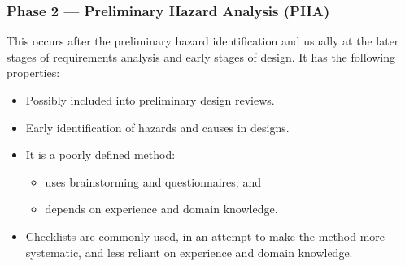 \subsubsection*{Phase 2 --- Preliminary Hazard Analysis (PHA)}

 This occurs after the preliminary hazard identification and usually 
    at the later stages of requirements analysis and early stages of 
    design. It has the following properties:

\begin{itemize}

    \item Possibly included into preliminary design reviews.
    
    \item Early identification of hazards and causes in designs.
    
    \item It is a poorly defined method:
    
        \begin{itemize}
	\setlength{\itemsep}{2pt}\setlength{\topsep}{2pt}
        
            \item uses brainstorming and questionnaires; and
            
            \item depends on experience and domain knowledge.
        
        \end{itemize}

    \item Checklists are commonly used, in an attempt to make the method more systematic, and less reliant on experience and domain knowledge.

\end{itemize}


